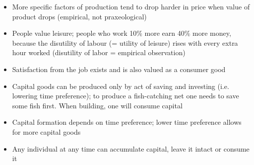 \documentclass[]{article}
\begin{document}
\begin{itemize}
    \item More specific factors of production tend to drop harder in price when value of product drops (empirical, not praxeological)
    \item People value leisure; people who work 10\% more earn 40\% more money, because the disutility of labour (= utility of leisure) rises with every extra hour worked (disutility of labor = empirical observation)
    \item Satisfaction from the job exists and is also valued as a consumer good
    \item Capital goods can be produced only by act of saving and investing (i.e. lowering time preference); to produce a fish-catching net one needs to save some fish first. When building, one will consume capital
    \item Capital formation depends on time preference; lower time preference allows for more capital goods
    \item Any individual at any time can accumulate capital, leave it intact or consume it
\end{itemize}
\end{document}
